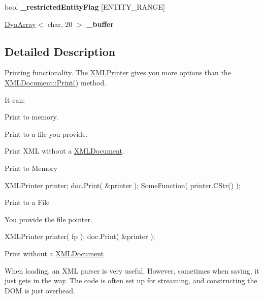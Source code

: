 \begin{DoxyCompactItemize}
\item 
bool {\bfseries \+\_\+restricted\+Entity\+Flag} \mbox{[}E\+N\+T\+I\+T\+Y\+\_\+\+R\+A\+N\+GE\mbox{]}\hypertarget{classtinyxml2_1_1_x_m_l_printer_a5df242509d42ae1c9128924121ebe093}{}\label{classtinyxml2_1_1_x_m_l_printer_a5df242509d42ae1c9128924121ebe093}

\item 
\hyperlink{classtinyxml2_1_1_dyn_array}{Dyn\+Array}$<$ char, 20 $>$ {\bfseries \+\_\+buffer}\hypertarget{classtinyxml2_1_1_x_m_l_printer_a19fca2e934576a892fefe2f602874d59}{}\label{classtinyxml2_1_1_x_m_l_printer_a19fca2e934576a892fefe2f602874d59}

\end{DoxyCompactItemize}


\subsection{Detailed Description}
Printing functionality. The \hyperlink{classtinyxml2_1_1_x_m_l_printer}{X\+M\+L\+Printer} gives you more options than the \hyperlink{classtinyxml2_1_1_x_m_l_document_a686ea28672c0e0c60383ec28148c1ac0}{X\+M\+L\+Document\+::\+Print()} method.

It can\+:
\begin{DoxyEnumerate}
\item Print to memory.
\item Print to a file you provide.
\item Print X\+ML without a \hyperlink{classtinyxml2_1_1_x_m_l_document}{X\+M\+L\+Document}.
\end{DoxyEnumerate}

Print to Memory

\begin{DoxyVerb}XMLPrinter printer;
doc.Print( &printer );
SomeFunction( printer.CStr() );
\end{DoxyVerb}


Print to a File

You provide the file pointer. \begin{DoxyVerb}XMLPrinter printer( fp );
doc.Print( &printer );
\end{DoxyVerb}


Print without a \hyperlink{classtinyxml2_1_1_x_m_l_document}{X\+M\+L\+Document}

When loading, an X\+ML parser is very useful. However, sometimes when saving, it just gets in the way. The code is often set up for streaming, and constructing the D\+OM is just overhead.

